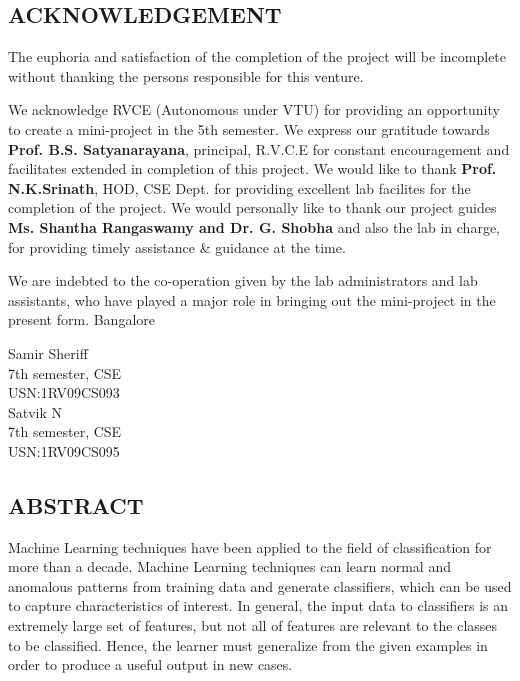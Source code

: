 \documentclass[12pt]{report}
\begin{document}
  
\setcounter{page}{1}
\begin{center}
\section*{ACKNOWLEDGEMENT}
\end{center}
The euphoria and satisfaction of the completion of the project will be incomplete
without thanking the persons responsible for this venture.


We acknowledge RVCE (Autonomous under VTU) for providing an opportunity to
create a mini-project in the 5th semester. We express our gratitude towards \textbf{Prof. B.S. Satyanarayana}, principal, R.V.C.E for constant encouragement and facilitates extended in completion of this project. We would like to thank \textbf{Prof. N.K.Srinath}, HOD, CSE
Dept. for providing excellent lab facilites for the completion of the project. We would
personally like to thank our project guides \textbf{Ms. Shantha Rangaswamy and Dr. G. Shobha} and also the lab in charge, for providing timely assistance \& guidance at the time.



We are indebted to the co-operation given by the lab administrators and lab assistants,
who have played a major role in bringing out the mini-project in the present form.
Bangalore



\begin{flushright}
Samir Sheriff\\
7th semester, CSE\\
USN:1RV09CS093\\

Satvik N\\
7th semester, CSE\\
USN:1RV09CS095\\

\end{flushright}

\newpage

\begin{center}
\section*{ABSTRACT}
\end{center} 
Machine Learning techniques have been applied to the field of classification for more than a decade. Machine Learning techniques can learn normal and anomalous patterns from training data and generate classifiers, which
can be used to capture characteristics of interest. In general, the input data to classifiers is an extremely large set of features, but not all of features are relevant to the classes to be classified.
Hence, the learner must generalize from the given examples in order to produce a useful output in new cases. 
\end{document}
